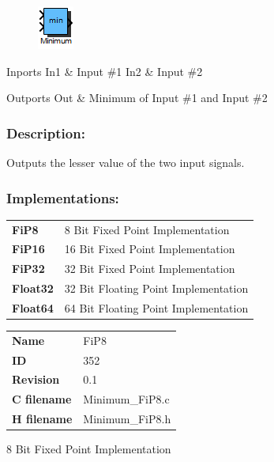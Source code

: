 \label{block:Minimum}
\begin{figure}[H]\includegraphics{Minimum}\end{figure} 

\begin{XtoCtabular}{Inports}
In1 & Input \#1\tabularnewline
\hline
In2 & Input \#2\tabularnewline
\hline
\end{XtoCtabular}


\begin{XtoCtabular}{Outports}
Out & Minimum of Input \#1 and Input \#2\tabularnewline
\hline
\end{XtoCtabular}

\subsubsection*{Description:}
Outputs the lesser value of the two input signals.


\subsubsection*{Implementations:}
\begin{tabular}{l l}
\textbf{FiP8} & 8 Bit Fixed Point Implementation\tabularnewline
\textbf{FiP16} & 16 Bit Fixed Point Implementation\tabularnewline
\textbf{FiP32} & 32 Bit Fixed Point Implementation\tabularnewline
\textbf{Float32} & 32 Bit Floating Point Implementation\tabularnewline
\textbf{Float64} & 64 Bit Floating Point Implementation\tabularnewline
\end{tabular}

\nopagebreak[0]
\begin{tabular}{l l}
\textbf{Name} & FiP8 \tabularnewline
\textbf{ID} & 352 \tabularnewline
\textbf{Revision} & 0.1 \tabularnewline
\textbf{C filename} & Minimum\_FiP8.c \tabularnewline
\textbf{H filename} & Minimum\_FiP8.h \tabularnewline
\end{tabular}
\vspace{1ex}

8 Bit Fixed Point Implementation

